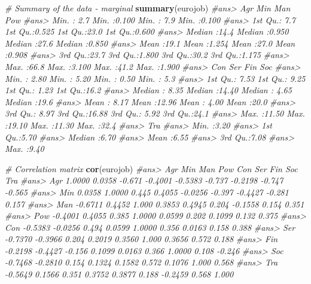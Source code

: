\documentclass[]{book}
\newenvironment{Shaded}{\begin{snugshade}}{\end{snugshade}}
\newcommand{\KeywordTok}[1]{\textcolor[rgb]{0.13,0.29,0.53}{\textbf{#1}}}
\newcommand{\CommentTok}[1]{\textcolor[rgb]{0.56,0.35,0.01}{\textit{#1}}}
\newcommand{\NormalTok}[1]{#1}
\begin{document}
\begin{Shaded}
\begin{Highlighting}[]
\CommentTok{# Summary of the data - marginal}
\KeywordTok{summary}\NormalTok{(eurojob)}
\CommentTok{#ans>       Agr            Min             Man            Pow       }
\CommentTok{#ans>  Min.   : 2.7   Min.   :0.100   Min.   : 7.9   Min.   :0.100  }
\CommentTok{#ans>  1st Qu.: 7.7   1st Qu.:0.525   1st Qu.:23.0   1st Qu.:0.600  }
\CommentTok{#ans>  Median :14.4   Median :0.950   Median :27.6   Median :0.850  }
\CommentTok{#ans>  Mean   :19.1   Mean   :1.254   Mean   :27.0   Mean   :0.908  }
\CommentTok{#ans>  3rd Qu.:23.7   3rd Qu.:1.800   3rd Qu.:30.2   3rd Qu.:1.175  }
\CommentTok{#ans>  Max.   :66.8   Max.   :3.100   Max.   :41.2   Max.   :1.900  }
\CommentTok{#ans>       Con             Ser             Fin             Soc      }
\CommentTok{#ans>  Min.   : 2.80   Min.   : 5.20   Min.   : 0.50   Min.   : 5.3  }
\CommentTok{#ans>  1st Qu.: 7.53   1st Qu.: 9.25   1st Qu.: 1.23   1st Qu.:16.2  }
\CommentTok{#ans>  Median : 8.35   Median :14.40   Median : 4.65   Median :19.6  }
\CommentTok{#ans>  Mean   : 8.17   Mean   :12.96   Mean   : 4.00   Mean   :20.0  }
\CommentTok{#ans>  3rd Qu.: 8.97   3rd Qu.:16.88   3rd Qu.: 5.92   3rd Qu.:24.1  }
\CommentTok{#ans>  Max.   :11.50   Max.   :19.10   Max.   :11.30   Max.   :32.4  }
\CommentTok{#ans>       Tra      }
\CommentTok{#ans>  Min.   :3.20  }
\CommentTok{#ans>  1st Qu.:5.70  }
\CommentTok{#ans>  Median :6.70  }
\CommentTok{#ans>  Mean   :6.55  }
\CommentTok{#ans>  3rd Qu.:7.08  }
\CommentTok{#ans>  Max.   :9.40}

\CommentTok{# Correlation matrix}
\KeywordTok{cor}\NormalTok{(eurojob)}
\CommentTok{#ans>         Agr     Min    Man     Pow     Con    Ser     Fin    Soc    Tra}
\CommentTok{#ans> Agr  1.0000  0.0358 -0.671 -0.4001 -0.5383 -0.737 -0.2198 -0.747 -0.565}
\CommentTok{#ans> Min  0.0358  1.0000  0.445  0.4055 -0.0256 -0.397 -0.4427 -0.281  0.157}
\CommentTok{#ans> Man -0.6711  0.4452  1.000  0.3853  0.4945  0.204 -0.1558  0.154  0.351}
\CommentTok{#ans> Pow -0.4001  0.4055  0.385  1.0000  0.0599  0.202  0.1099  0.132  0.375}
\CommentTok{#ans> Con -0.5383 -0.0256  0.494  0.0599  1.0000  0.356  0.0163  0.158  0.388}
\CommentTok{#ans> Ser -0.7370 -0.3966  0.204  0.2019  0.3560  1.000  0.3656  0.572  0.188}
\CommentTok{#ans> Fin -0.2198 -0.4427 -0.156  0.1099  0.0163  0.366  1.0000  0.108 -0.246}
\CommentTok{#ans> Soc -0.7468 -0.2810  0.154  0.1324  0.1582  0.572  0.1076  1.000  0.568}
\CommentTok{#ans> Tra -0.5649  0.1566  0.351  0.3752  0.3877  0.188 -0.2459  0.568  1.000}


\end{Highlighting}
\end{Shaded}
\end{document}
